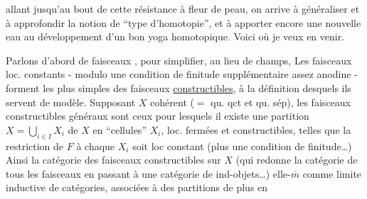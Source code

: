 allant jusqu'au bout\unsure{,} de cette résistance à fleur de peau, on arrive à généraliser et à approfondir la notion de ``type d'homotopie'', et à apporter encore une nouvelle eau au développement d'un bon yoga homotopique. Voici où je veux en venir.

Parlons d'abord de faisceaux , pour simplifier, au lieu de champs,  Les faisceaux loc. constants - modulo une condition de finitude supplémentaire assez anodine - forment les plus simples des faisceaux \uline{constructibles}, à la définition desquels ils servent de modèle. Supposant $X$ cohérent ($=$ qu. qct et qu. sép), les faisceaux constructibles généraux sont ceux pour lesquels il existe une partition  $X=\bigcup\limits_{i\in I}X_i$ de $X$ en ``cellules''  $X_i$, loc. fermées et constructibles, telles que  la restriction de $F$ à chaque $X_i$ soit loc constant  (plus une condition de finitude\ldots) Ainsi la catégorie des faisceaux constructibles sur $X$  (qui redonne la catégorie de tous les faisceaux en passant à une catégorie de ind-objets\ldots)  elle-$\overline m$ comme limite inductive de catégories, associées à des partitions de plus en

